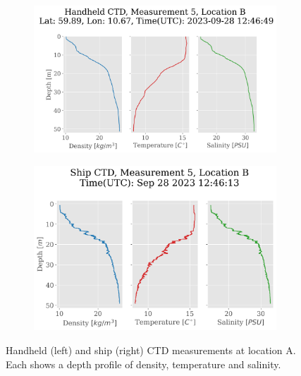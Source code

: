 \documentclass[a4paper,10pt,english]{article}
\begin{document}
    \begin{figure}[H]
        \begin{adjustwidth}{-2.5cm}{-2.5cm}  %
        \begin{subfigure}{0.65\textwidth}
                \centering
                \includegraphics[width=1.\linewidth]{../figures/handheld_ctd/handhedld_ctd_Measurement_5_Location_B.png}
                \caption{}
                \label{fig:handheld_m1lA}
        \end{subfigure}%
        \begin{subfigure}{0.65\textwidth}
                \centering
                \includegraphics[width=1.\linewidth]{../figures/ship_ctd/ship_ctd_Measurement_5_Location_B.png}
                \caption{}
                \label{fig:handheld_m6lA}
        \end{subfigure}
        \end{adjustwidth}
        
        \caption{Handheld (left) and ship (right) CTD measurements at location A. Each shows a depth profile of density, temperature and salinity.}
        \label{fig:location_Aapp}
        \end{figure}
    
\end{document}
